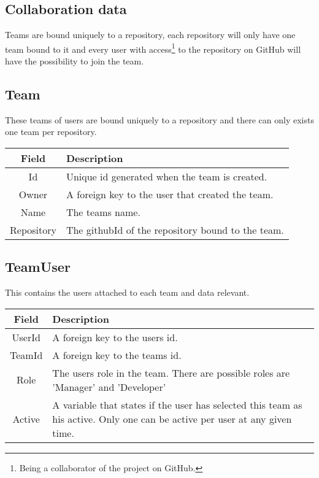 \subsection{Collaboration data}
Teams are bound uniquely to a repository, each repository will only have one team bound to it and every user with access\footnote{Being a collaborator of the project on GitHub.} to the repository on GitHub will have the possibility to join the team.  


\subsection*{Team}
These teams of users are bound uniquely to a repository and there can only exists one team per repository. \\

\vspace{0.5cm}
\begin{tabularx}{\linewidth}{| c | X |}
    \hline
    \rowcolor[gray]{0.8}
    \textbf{Field} & \textbf{Description} \\
    \hline
    Id & Unique id generated when the team is created.\\ \hline
   	Owner & A foreign key to the user that created the team.\\ \hline
   	Name & The teams name.\\ \hline
    Repository & The githubId of the repository bound to the team.\\ 
    \hline
\end{tabularx}
\vspace{0.5cm}

\subsection*{TeamUser}
This contains the users attached to each team and data relevant. \\

\vspace{0.5cm}
\begin{tabularx}{\linewidth}{| c | X |}
    \hline
    \rowcolor[gray]{0.8}
    \textbf{Field} & \textbf{Description} \\
    \hline
    UserId & A foreign key to the users id.\\ \hline
   	TeamId & A foreign key to the teams id.\\ \hline
   	Role & The users role in the team. There are possible roles are 'Manager' and 'Developer'\\ \hline
    Active & A variable that states if the user has selected this team as his active. Only one can be active per user at any given time.\\ 
    \hline
\end{tabularx}
\vspace{0.5cm}


